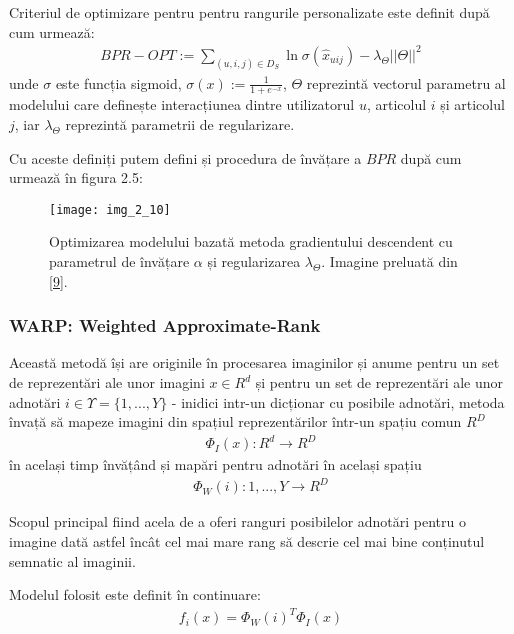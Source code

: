 Criteriul de optimizare pentru pentru rangurile personalizate este definit după cum urmează:
\begin{align}
	BPR-OPT := \sum_{(u,i,j) \in D_S} \ln{\sigma(\hat{x}_{uij})} - \lambda_\Theta||\Theta||^2
\end{align}
unde $\sigma$ este funcția sigmoid, $\sigma(x) := \frac{1}{1+e^{-x}}$, $\Theta$ reprezintă vectorul parametru al modelului care definește interacțiunea dintre utilizatorul $u$, articolul $i$ și articolul $j$, iar $\lambda_\Theta$ reprezintă parametrii de regularizare.

Cu aceste definiți putem defini și procedura de învățare a $BPR$ după cum urmează în figura 2.5:
\begin{figure}[!h]
	\centering
	\texttt{[image: img\_2\_10]}
	\caption[Procedura de învățarea BPR]{Optimizarea modelului bazată metoda gradientului descendent cu parametrul de învățare $\alpha$ și regularizarea $\lambda_\Theta$. Imagine preluată din \hyperlink{SteffenRendleChristophFreudenthalerZenoGantnerLarsSchmidtThieme}{[9]}.}
\end{figure}

\vspace{5mm}
\subsubsection*{WARP: Weighted Approximate-Rank}
Această metodă își are originile în procesarea imaginilor și anume pentru un set de reprezentări ale unor imagini $x \in R^d$ și pentru un set de reprezentări ale unor adnotări $i \in \Upsilon = \{1, ..., Y\}$ - inidici intr-un dicționar cu posibile adnotări, metoda învață să mapeze imagini din spațiul reprezentărilor într-un spațiu comun $R^D$
\begin{align}
	\Phi_{I}(x):R^d \rightarrow R^D
\end{align}
în același timp învățând și mapări pentru adnotări în același spațiu
\begin{align}
	\Phi_{W}(i):{1,...,Y} \rightarrow R^D
\end{align}

Scopul principal fiind acela de a oferi ranguri posibilelor adnotări pentru o imagine dată astfel încât cel mai mare rang să descrie cel mai bine conținutul semnatic al imaginii. 

Modelul folosit este definit în continuare:
\begin{align}
	f_{i}(x) = \Phi_{W}(i)^T \Phi_{I}(x)
\end{align}


